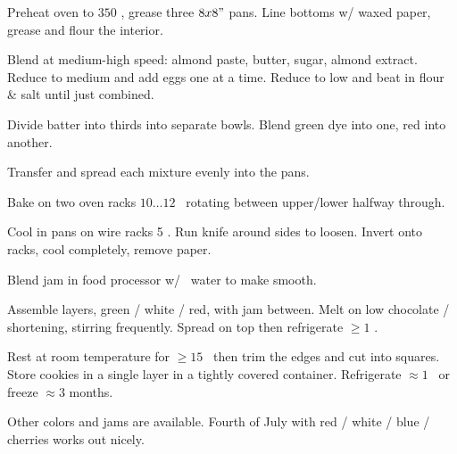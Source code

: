 \begin{preparation}
\item Preheat oven to $350$ \Fahrenheit, grease three $8x8"$ pans.
Line bottoms w/ waxed paper, grease and flour the interior.

\item Blend at medium-high speed: almond paste, butter, sugar, almond extract.
Reduce to medium and add eggs one at a time.
Reduce to low and beat in flour \& salt until just combined.

\item Divide batter into thirds into separate bowls.
Blend green dye into one, red into another.

\item Transfer and spread each mixture evenly into the pans.

\item Bake on two oven racks $10 \dots 12$ \minute~rotating between upper/lower halfway through.

\item Cool in pans on wire racks 5 \minute.
	Run knife around sides to loosen.
	Invert onto racks, cool completely, remove paper.

\item Blend jam in food processor w/ \teaspoon~water to make smooth.

\item Assemble layers, green / white / red, with jam between.
	Melt on low chocolate / shortening, stirring frequently.
	Spread on top then refrigerate $\geq1$ \hour.

\item Rest at room temperature for $\geq 15$ \minute~then trim the edges and cut into squares.
	Store cookies in a single layer in a tightly covered container.
	Refrigerate $\approx 1$ \week~or freeze $\approx 3$ months.
\end{preparation}


\begin{variation}
\item Other colors and jams are available.
	Fourth of July with red / white / blue / cherries works out nicely.
\end{variation}
\recipeend
